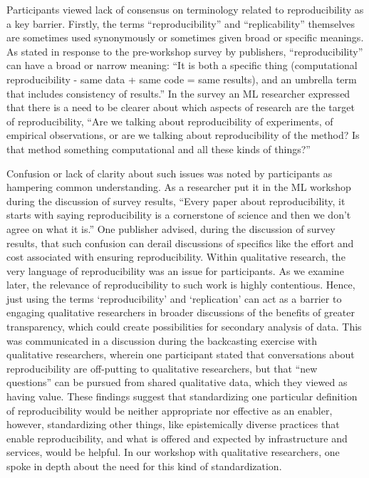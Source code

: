 \documentclass[authordate, meta]{jote-new-article}
\begin{document}
	\noindent Participants viewed lack of consensus on terminology related to reproducibility as a key barrier. Firstly, the terms “reproducibility” and “replicability” themselves are sometimes used synonymously or sometimes given broad or specific meanings. As stated in response to the pre-workshop survey by publishers, “reproducibility” can have a broad or narrow meaning: “It is both a specific thing (computational reproducibility - same data + same code = same results), and an umbrella term that includes consistency of results.” In the survey an ML researcher expressed that there is a need to be clearer about which aspects of research are the target of reproducibility, “Are we talking about reproducibility of experiments, of empirical observations, or are we talking about reproducibility of the method? Is that method something computational and all these kinds of things?”



	Confusion or lack of clarity about such issues was noted by participants as hampering common understanding. As a researcher put it in the ML workshop during the discussion of survey results, “Every paper about reproducibility, it starts with saying reproducibility is a cornerstone of science and then we don't agree on what it is.” One publisher advised, during the discussion of survey results, that such confusion can derail discussions of specifics like the effort and cost associated with ensuring reproducibility. Within qualitative research, the very language of reproducibility was an issue for participants. As we examine later, the relevance of reproducibility to such work is highly contentious. Hence, just using the terms ‘reproducibility' and ‘replication' can act as a barrier to engaging qualitative researchers in broader discussions of the benefits of greater transparency, which could create possibilities for secondary analysis of data. This was communicated in a discussion during the backcasting exercise with qualitative researchers, wherein one participant stated that conversations about reproducibility are off-putting to qualitative researchers, but that “new questions” can be pursued from shared qualitative data, which they viewed as having value. These findings suggest that standardizing one particular definition of reproducibility would be neither appropriate nor effective as an enabler, however, standardizing other things, like epistemically diverse practices that enable reproducibility, and what is offered and expected by infrastructure and services, would be helpful. In our workshop with qualitative researchers, one spoke in depth about the need for this kind of standardization.
\end{document}
